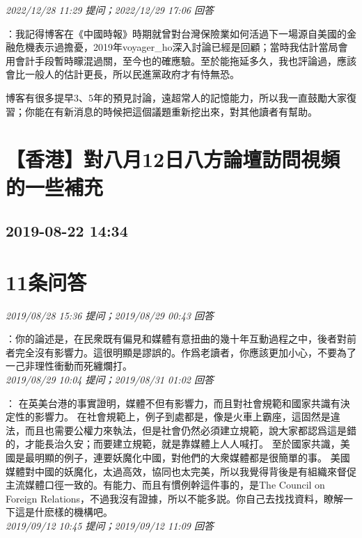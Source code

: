 \documentclass[twocolumn]{ctexart}
\begin{document}
\textit{\hfill\noindent\small 2022/12/28 11:29 提问；2022/12/29 17:06 回答}

：我記得博客在《中國時報》時期就曾對台灣保險業如何活過下一場源自美國的金融危機表示過擔憂，2019年voyager\_ho深入討論已經是回顧；當時我估計當局會用會計手段暫時矇混過關，至今也的確應驗。至於能拖延多久，我也評論過，應該會比一般人的估計更長，所以民進黨政府才有恃無恐。

博客有很多提早3、5年的預見討論，遠超常人的記憶能力，所以我一直鼓勵大家復習；你能在有新消息的時候把這個議題重新挖出來，對其他讀者有幫助。
\\


\section{【香港】對八月12日八方論壇訪問視頻的一些補充}
\subsection{2019-08-22 14:34}


\section{11条问答}

\textit{\hfill\noindent\small 2019/08/28 15:36 提问；2019/08/29 00:43 回答}

：你的論述是，在民衆既有偏見和媒體有意扭曲的幾十年互動過程之中，後者對前者完全沒有影響力。這很明顯是謬誤的。作爲老讀者，你應該更加小心，不要為了一己非理性衝動而死纏爛打。
\\

\textit{\hfill\noindent\small 2019/08/29 10:04 提问；2019/08/31 01:02 回答}

：
在英美台港的事實證明，媒體不但有影響力，而且對社會規範和國家共識有決定性的影響力。 
在社會規範上，例子到處都是，像是火車上霸座，這固然是違法，而且也需要公權力來執法，但是社會仍然必須建立規範，說大家都認爲這是錯的，才能長治久安；而要建立規範，就是靠媒體上人人喊打。 
至於國家共識，美國是最明顯的例子，連要妖魔化中國，對他們的大衆媒體都是很簡單的事。 
美國媒體對中國的妖魔化，太過高效，協同也太完美，所以我覺得背後是有組織來督促主流媒體口徑一致的。有能力、而且有慣例幹這件事的，是The Council on Foreign Relations，不過我沒有證據，所以不能多説。你自己去找找資料，瞭解一下這是什麽樣的機構吧。
\\

\textit{\hfill\noindent\small 2019/09/12 10:45 提问；2019/09/12 11:09 回答}
\end{document}
